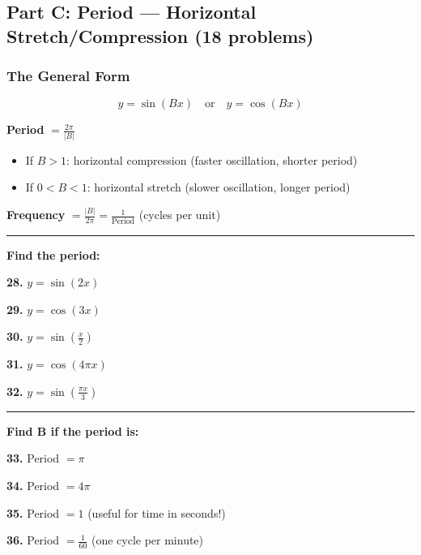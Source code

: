 \documentclass[
  11pt,
]{article}
\providecommand{\tightlist}{%
  \setlength{\itemsep}{0pt}\setlength{\parskip}{0pt}}
\begin{document}
\hypertarget{part-c-period-horizontal-stretchcompression-18-problems}{%
\subsection{Part C: Period --- Horizontal Stretch/Compression (18
problems)}\label{part-c-period-horizontal-stretchcompression-18-problems}}

\hypertarget{the-general-form-1}{%
\subsubsection{The General Form}\label{the-general-form-1}}

\[y = \sin(Bx) \quad \text{or} \quad y = \cos(Bx)\]

\textbf{Period} \(= \frac{2\pi}{|B|}\)

\begin{itemize}
\tightlist
\item
  If \(B > 1\): horizontal compression (faster oscillation, shorter
  period)
\item
  If \(0 < B < 1\): horizontal stretch (slower oscillation, longer
  period)
\end{itemize}

\textbf{Frequency} \(= \frac{|B|}{2\pi} = \frac{1}{\text{Period}}\)
(cycles per unit)

\begin{center}\rule{0.5\linewidth}{0.5pt}\end{center}

\textbf{Find the period:}

\textbf{28.} \(y = \sin(2x)\)

\textbf{29.} \(y = \cos(3x)\)

\textbf{30.} \(y = \sin\left(\frac{x}{2}\right)\)

\textbf{31.} \(y = \cos(4\pi x)\)

\textbf{32.} \(y = \sin\left(\frac{\pi x}{3}\right)\)

\begin{center}\rule{0.5\linewidth}{0.5pt}\end{center}

\textbf{Find B if the period is:}

\textbf{33.} Period \(= \pi\)

\textbf{34.} Period \(= 4\pi\)

\textbf{35.} Period \(= 1\) (useful for time in seconds!)

\textbf{36.} Period \(= \frac{1}{60}\) (one cycle per minute)
\end{document}
